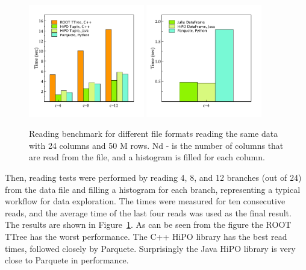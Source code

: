 \begin{figure}[h!]
  \begin{center}
    \includegraphics[width=0.45\textwidth]{images/read_benchmark.pdf}
     \includegraphics[width=0.45\textwidth]{images/data_frame_benchmark.pdf}
 \end{center}
  \caption{Reading benchmark for different file formats reading the same data with 24 columns and 50 M rows. Nd - is the number of columns that are read from the file, and a histogram is filled for each column. }
 \label{read_benchmark}
\end{figure}

Then, reading tests were performed by reading 4, 8, and 12 branches (out of 24) from the data file and filling a histogram for each branch, representing a typical workflow for data exploration. The times were measured for ten consecutive reads, and the average time of the last four reads was used as the final result. The results are shown in Figure~\ref{read_benchmark}. As can be seen from the figure the ROOT TTree has the worst performance. The C++ HiPO library has the best read times, followed closely by Parquete. Surprisingly the Java HiPO library is very close to Parquete in performance. 


